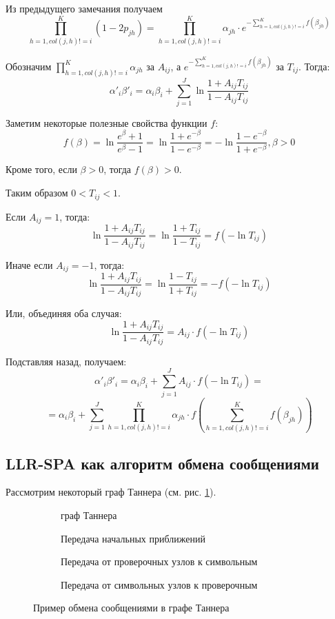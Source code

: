 Из предыдущего замечания получаем
\[
\prod_{h=1,col(j,h)!=i}^{K}(1-2p_{jh}) = \prod_{h=1,col(j,h)!=i}^{K} \alpha_{jh} \cdot 
 e^{-\sum_{h=1,col(j,h)!=i}^{K} f(\beta_{jh})}
\]

Обозначим $\prod_{h=1,col(j,h)!=i}^{K} \alpha_{jh}$ за $A_{ij}$, а 
$e^{-\sum_{h=1,col(j,h)!=i}^{K}f(\beta_{jh})}$ за $T_{ij}$. Тогда:
\[
		\alpha'_i \beta'_i= \alpha_i \beta_i + \sum_{j=1}^J 
		\ln \frac{1+A_{ij}T_{ij}}{1-A_{ij}T_{ij}}
\]

Заметим некоторые полезные свойства функции $f$:
\[
	f(\beta)=\ln \frac{e^{\beta}+1}{e^{\beta}-1}=\ln \frac{1+e^{-\beta}}{1-e^{-\beta}}
=-\ln \frac{1-e^{-\beta}}{1+e^{-\beta}}, \beta>0
\]

Кроме того, если $\beta>0$, тогда $f(\beta)>0$.

Таким образом $0 < T_{ij} < 1$.

Если $A_{ij}=1$, тогда:
\[
\ln \frac{1+A_{ij}T_{ij}}{1-A_{ij}T_{ij}}=\ln \frac{1+T_{ij}}{1-T_{ij}}=f(-\ln T_{ij})
\]

Иначе если  $A_{ij}=-1$, тогда:
\[
\ln \frac{1+A_{ij}T_{ij}}{1-A_{ij}T_{ij}}=\ln \frac{1-T_{ij}}{1+T_{ij}}=-f(-\ln T_{ij})
\]

Или, объединяя оба случая:
\[
\ln \frac{1+A_{ij}T_{ij}}{1-A_{ij}T_{ij}}=A_{ij} \cdot f(-\ln T_{ij})
\]

Подставляя назад, получаем:
\[
		\alpha'_i \beta'_i= \alpha_i \beta_i + \sum_{j=1}^J 
		A_{ij} \cdot f(-\ln T_{ij})=
\]
\[
=	\alpha_i \beta_i + \sum_{j=1}^J \prod_{h=1,col(j,h)!=i}^{K} \alpha_{jh} \cdot
		f(\sum_{h=1,col(j,h)!=i}^{K}f(\beta_{jh}))
\]

\subsection{LLR-SPA как алгоритм обмена сообщениями}

Рассмотрим некоторый граф Таннера (см. рис. \ref{dec1}).

\begin{figure}[h!]
\centering
\begin{subfigure}{.5\textwidth}
  \centering
  \caption{граф Таннера}
  \label{dec1}
\end{subfigure}%
\begin{subfigure}{.5\textwidth}
  \centering
  \caption{Передача начальных приближений}
  \label{dec2}
\end{subfigure}

\begin{subfigure}{.5\textwidth}
  \centering
  \caption{Передача от проверочных узлов к символьным}
  \label{dec3}
\end{subfigure}%
\begin{subfigure}{.5\textwidth}
  \centering
  \caption{Передача от символьных узлов к проверочным}
  \label{dec4}
\end{subfigure}
\caption{Пример обмена сообщениями в графе Таннера}
\end{figure}

